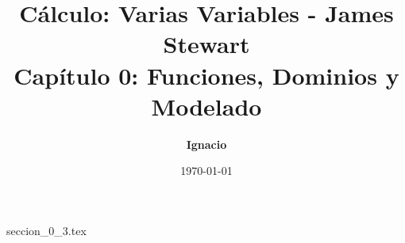 \documentclass[11pt,spanish,oneside]{report}
\title{\textbf{Cálculo: Varias Variables - James Stewart} \\ \Large Capítulo 0: Funciones, Dominios y Modelado}
\author{\textbf{Ignacio}}
\date{\today}
\begin{document}
\maketitle

{seccion_0_3.tex}
\end{document}
